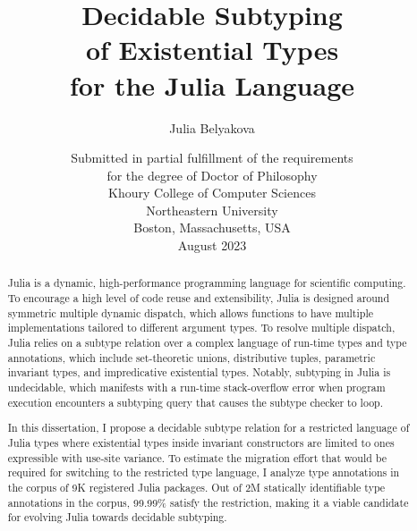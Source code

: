 \title{Decidable Subtyping\\ of Existential Types\\for the Julia Language}

\author{Julia Belyakova}

\date{\normalsize%
\vfill
\vspace{6cm}
Submitted in partial fulfillment of the requirements\\
for the degree of Doctor of Philosophy\\
\vspace{1em}
Khoury College of Computer Sciences\\
Northeastern University\\
Boston, Massachusetts, USA\\
\vspace{1em}
August 2023
}

\maketitle



\begin{abstract}

Julia is a dynamic, high-performance programming language
for scientific computing.
To encourage a high level of code reuse and extensibility, Julia is
designed around symmetric multiple dynamic dispatch, which allows functions
to have multiple implementations tailored to different argument types.
To resolve multiple dispatch, Julia relies on a subtype relation over a complex
language of run-time types and type annotations, 
which include set-theoretic unions, distributive tuples, parametric invariant 
types, and impredicative existential types.
Notably, subtyping in Julia is undecidable, which
manifests with a run-time stack-overflow error when program execution encounters
a subtyping query that causes the subtype checker to loop.

In this dissertation, I propose a decidable subtype relation for a restricted
language of Julia types where existential types inside invariant constructors
are limited to ones expressible with use-site variance.
To estimate the migration effort that would be required for switching to the 
restricted type language, I analyze type annotations in the corpus of 9K
registered Julia packages.
Out of 2M statically identifiable type annotations in the corpus,
99.99\% satisfy the restriction, making it a viable candidate for
evolving Julia towards decidable subtyping.

\end{abstract}
